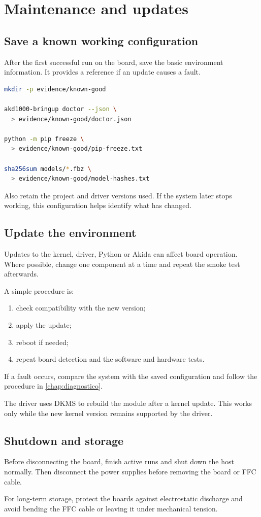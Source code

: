 \chapter{Maintenance and updates}
\label{chap:mantenimiento}

\section{Save a known working configuration}

After the first successful run on the board, save the basic environment information.
It provides a reference if an update causes a fault.

\begin{lstlisting}[language=bash]
mkdir -p evidence/known-good

akd1000-bringup doctor --json \
  > evidence/known-good/doctor.json

python -m pip freeze \
  > evidence/known-good/pip-freeze.txt

sha256sum models/*.fbz \
  > evidence/known-good/model-hashes.txt
\end{lstlisting}

Also retain the project and driver versions used. If the system later stops working,
this configuration helps identify what has changed.

\section{Update the environment}

Updates to the kernel, driver, Python or Akida can affect board operation. Where
possible, change one component at a time and repeat the smoke test afterwards.

A simple procedure is:

\begin{enumerate}
  \item check compatibility with the new version;
  \item apply the update;
  \item reboot if needed;
  \item repeat board detection and the software and hardware tests.
\end{enumerate}

If a fault occurs, compare the system with the saved configuration and follow the
procedure in \cref{chap:diagnostico}.

The driver uses DKMS to rebuild the module after a kernel update. This works only
while the new kernel version remains supported by the driver.

\section{Shutdown and storage}

Before disconnecting the board, finish active runs and shut down the host normally.
Then disconnect the power supplies before removing the board or FFC cable.

For long-term storage, protect the boards against electrostatic discharge and avoid
bending the FFC cable or leaving it under mechanical tension.
